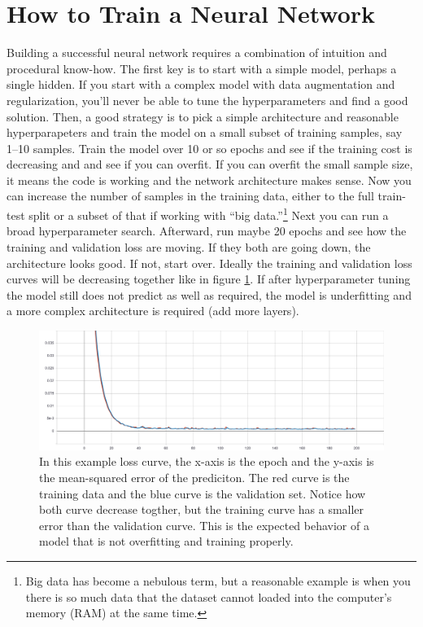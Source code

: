 \section{How to Train a Neural Network}
Building a successful neural network requires a combination of intuition and procedural know-how. The first key is to start with a simple model, perhaps a single hidden. If you start with a complex model with data augmentation and regularization, you’ll never be able to tune the hyperparameters and find a good solution. Then, a good strategy is to pick a simple architecture and reasonable hyperparapeters and train the model on a small subset of training samples, say 1--10 samples. Train the model over 10 or so epochs and see if the training cost is decreasing and and see if you can overfit. If you can overfit the small sample size, it means the code is working and the network architecture makes sense. Now you can increase the number of samples in the training data, either to the full train-test split or a subset of that if working with ``big data.''\footnote{Big data has become a nebulous term, but a reasonable example is when you there is so much data that the dataset cannot loaded into the computer's memory (RAM) at the same time.} Next you can run a broad hyperparameter search. Afterward, run maybe 20 epochs and see how the training and validation loss are moving. If they both are going down, the architecture looks good. If not, start over. Ideally the training and validation loss curves will be decreasing together like in figure \ref{fig:Example-Training-Loss-Curve}. If after hyperparameter tuning the model still does not predict as well as required, the model is underfitting and a more complex architecture is required (add more layers).

\begin{figure}
    \includegraphics[width=\linewidth]{Chapters/Figures/epoch_loss1.pdf}
    \caption{In this example loss curve, the x-axis is the epoch and the y-axis is the mean-squared error of the prediciton. The red curve is the training data and the blue curve is the validation set. Notice how both curve decrease togther, but the training curve has a smaller error than the validation curve. This is the expected behavior of a model that is not overfitting and training properly.}
    \label{fig:Example-Training-Loss-Curve}
\end{figure}

